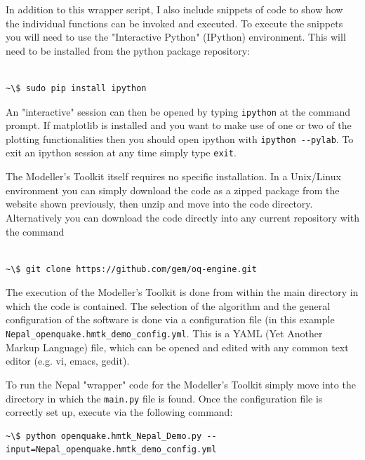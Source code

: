 In addition to this wrapper script, I also include snippets of code to show how the individual functions can be invoked and executed. To execute the snippets you will need to use the "Interactive Python" (IPython) environment. This will need to be installed from the python package repository:

\begin{Verbatim}[frame=single, commandchars=\\\{\}, fontsize=\scriptsize]

~\$ sudo pip install ipython

\end{Verbatim}

An "interactive" session can then be opened by typing \verb=ipython= at the command prompt. If matplotlib is installed and you want to make use of one or two of the plotting functionalities then you should open ipython with \verb=ipython --pylab=. To exit an ipython session at any time simply type \verb=exit=.

The Modeller's Toolkit itself requires no specific installation. In a Unix/Linux environment you can simply download the code as a zipped package from the website shown previously, then unzip and move into the code directory.
Alternatively you can download the code directly into  any current repository with the command

\begin{Verbatim}[frame=single, commandchars=\\\{\}, fontsize=\scriptsize]

~\$ git clone https://github.com/gem/oq-engine.git

\end{Verbatim}


The execution of the Modeller's Toolkit is done from within the main directory in which the code is contained. The selection of the algorithm and the general configuration of the software is done via a configuration file (in this example \verb=Nepal_openquake.hmtk_demo_config.yml=. This is a YAML (Yet Another Markup Language) file, which can be opened and edited with any common text editor (e.g. vi, emacs, gedit).

To run the Nepal "wrapper" code for the Modeller's Toolkit simply move into the directory in which the \verb=main.py= file is found. Once the configuration file is correctly set up, execute via the following command:
\begin{Verbatim}[frame=single, commandchars=\\\{\}, fontsize=\scriptsize]
~\$ python openquake.hmtk_Nepal_Demo.py --input=Nepal_openquake.hmtk_demo_config.yml
\end{Verbatim}

